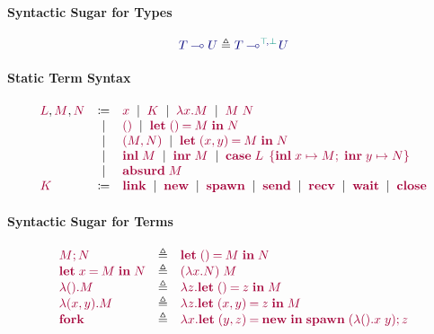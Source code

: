 \documentclass[main.tex]{subfiles}
\begin{document}
\paragraph*{Syntactic Sugar for Types}
\[
  \ty{\tylolli{T}{U}} \elabarrow \ty{\tylolli[\cs{\ptop},\cs{\pbot}]{T}{U}}
\]

\paragraph*{Static Term Syntax}
\[
\begin{array}{lcl}
  \tm{L}, \tm{M}, \tm{N}
  & \coloneqq & \tm{x}
    \sep        \tm{K}
    \sep        \tm{\lambda x.M}
    \sep        \tm{M\;N} \\
  & \sep      & \tm{\unit}
    \sep        \tm{\letunit{M}{N}} \\
  & \sep      & \tm{\pair{M}{N}}
    \sep        \tm{\letpair{x}{y}{M}{N}} \\
  & \sep      & \tm{\inl{M}}
    \sep        \tm{\inr{M}}
    \sep        \tm{\casesum{L}{x}{M}{y}{N}} \\
  & \sep      & \tm{\absurd{M}} \\
  \tm{K}
  & \coloneqq & \tm{\link}
    \sep        \tm{\new}
    \sep        \tm{\spawn}
    \sep        \tm{\send}
    \sep        \tm{\recv}
    \sep        \tm{\wait}
    \sep        \tm{\close}
\end{array}
\]

\paragraph*{Syntactic Sugar for Terms}
\[
\begin{array}{lcl}
  \tm{\andthen{M}{N}}
  & \elabarrow & \tm{\letunit{M}{N}} \\
  \tm{\letbind{x}{M}{N}}
  & \elabarrow & \tm{(\lambda x.N)\;M} \\
  \tm{\lambda\unit.M}
  & \elabarrow & \tm{\lambda z.\letunit{z}{M}} \\
  \tm{\lambda\pair{x}{y}.M}
  & \elabarrow & \tm{\lambda z.\letpair{x}{y}{z}{M}} \\
  \tm{\fork}
  & \elabarrow & \tm{\lambda x.\letpair{y}{z}{\new}{\andthen{\spawn\;{(\lambda\unit.x\;y)}}{z}}}
\end{array}
\]
\end{document}
